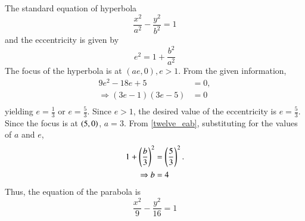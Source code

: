 The standard equation of hyperbola 
\begin{equation}
\frac{x^2}{a^2}-\frac{y^2}{b^2}=1
\end{equation}
%
and the eccentricity is given by
\begin{equation}
\label{twelve_eab}
e^2 = 1 + \frac{b^2}{a^2}
\end{equation}             
%
The focus of the hyperbola is at $(ae,0), e > 1$.  From the given information,             
%
\begin{align}
             9e^2-18e+5&=0 ,\\
          \Rightarrow      (3e-1)(3e-5)&=0\\
\end{align}
%
yielding $e=\frac{1}{3}$ or $e=\frac{5}{3}$.  Since $e > 1$, the desired value of the eccentricity is $e = \frac{5}{3}$.  Since the focus is at $\left(5,0\right)$, $a = 3$. From \eqref{twelve_eab}, substituting for the values of $a$ and $e$,
%
\begin{align}
1 + \left(\frac{b}{3}\right)^2 &= \left(\frac{5}{3}\right)^2. \\
\Rightarrow b &=4
\end{align}
%
Thus, the equation of the parabola is
\begin{equation}
\frac{x^2}{9}-\frac{y^2}{16}=1
\end{equation}
